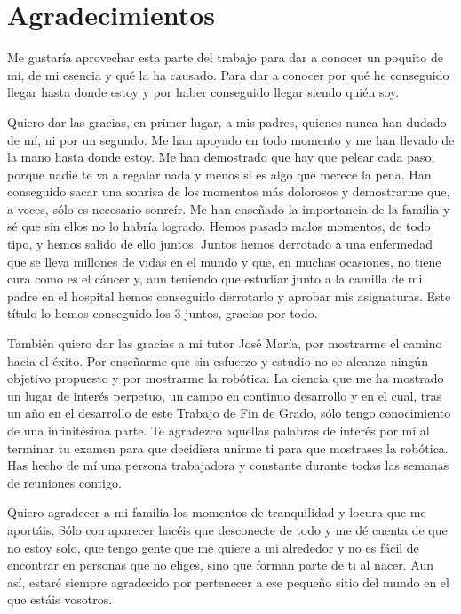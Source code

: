 \chapter*{Agradecimientos}
\setlength{\parskip}{1ex}

Me gustaría aprovechar esta parte del trabajo para dar a conocer un poquito de mí, de mi esencia y qué la ha causado. Para dar a conocer por qué he conseguido llegar hasta donde estoy y por haber conseguido llegar siendo quién soy.

Quiero dar las gracias, en primer lugar, a mis padres, quienes nunca han dudado de mí, ni por un segundo. Me han apoyado en todo momento y me han llevado de la mano hasta donde estoy. Me han demostrado que hay que pelear cada paso, porque nadie te va a regalar nada y menos si es algo que merece la pena. Han conseguido sacar una sonrisa de los momentos más dolorosos y demostrarme que, a veces, sólo es necesario sonreír. Me han enseñado la importancia de la familia y sé que sin ellos no lo habría logrado. Hemos pasado malos momentos, de todo tipo, y hemos salido de ello juntos. Juntos hemos derrotado a una enfermedad que se lleva millones de vidas en el mundo y que, en muchas ocasiones, no tiene cura como es el cáncer y, aun teniendo que estudiar junto a la camilla de mi padre en el hospital hemos conseguido derrotarlo y aprobar mis asignaturas. Este título lo hemos conseguido los 3 juntos, gracias por todo.

También quiero dar las gracias a mi tutor José María, por mostrarme el camino hacia el éxito. Por enseñarme que sin esfuerzo y estudio no se alcanza ningún objetivo propuesto y por mostrarme la robótica. La ciencia que me ha mostrado un lugar de interés perpetuo, un campo en continuo desarrollo y en el cual, tras un año en el desarrollo de este Trabajo de Fin de Grado, sólo tengo conocimiento de una infinitésima parte. Te agradezco aquellas palabras de interés por mí al terminar tu examen para que decidiera unirme ti para que mostrases la robótica. Has hecho de mí una persona trabajadora y constante durante todas las semanas de reuniones contigo.

Quiero agradecer a mi familia los momentos de tranquilidad y locura que me aportáis. Sólo con aparecer hacéis que desconecte de todo y me dé cuenta de que no estoy solo, que tengo gente que me quiere a mi alrededor y no es fácil de encontrar en personas que no eliges, sino que forman parte de ti al nacer. Aun así, estaré siempre agradecido por pertenecer a ese pequeño sitio del mundo en el que estáis vosotros.


